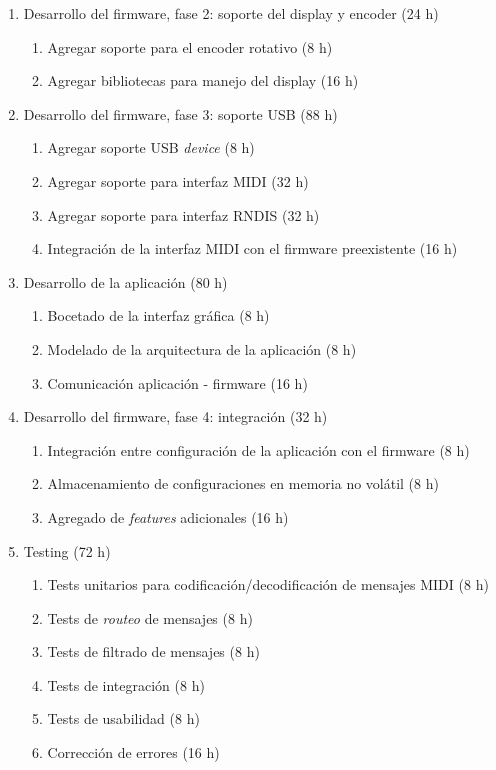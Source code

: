 \documentclass[
11pt, %
]{charter}
\begin{document}
\begin{enumerate}
	\item Desarrollo del firmware, fase 2: soporte del display y encoder (24 h)
	\begin{enumerate}
		\item Agregar soporte para el encoder rotativo (8 h)
		\item Agregar bibliotecas para manejo del display (16 h)
	\end{enumerate}
	
	\item Desarrollo del firmware, fase 3: soporte USB (88 h)
	\begin{enumerate}
		\item Agregar soporte USB \emph{device} (8 h)
		\item Agregar soporte para interfaz MIDI (32 h)
		\item Agregar soporte para interfaz RNDIS (32 h)
		\item Integración de la interfaz MIDI con el firmware preexistente (16 h)
	\end{enumerate}
	
	\item Desarrollo de la aplicación (80 h)
	\begin{enumerate}
		\item Bocetado de la interfaz gráfica (8 h)
		\item Modelado de la arquitectura de la aplicación (8 h)
		\item Comunicación aplicación - firmware (16 h)
	\end{enumerate}
	
	\item Desarrollo del firmware, fase 4: integración (32 h)
	\begin{enumerate}
		\item Integración entre configuración de la aplicación con el firmware (8 h)
		\item Almacenamiento de configuraciones en memoria no volátil (8 h)
		\item Agregado de \emph{features} adicionales (16 h)
	\end{enumerate}
	
	\item Testing (72 h)
	\begin{enumerate}
		\item Tests unitarios para codificación/decodificación de mensajes MIDI (8 h)
		\item Tests de \emph{routeo} de mensajes (8 h)
		\item Tests de filtrado de mensajes (8 h)
		\item Tests de integración (8 h)
		\item Tests de usabilidad (8 h)
		\item Corrección de errores (16 h)
	\end{enumerate}
	

\end{enumerate}
\end{document}
